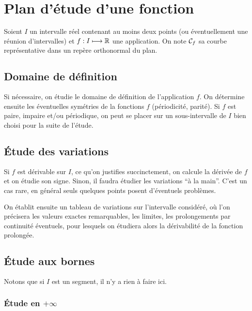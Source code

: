 \chapter{Plan d'étude d'une fonction}

Soient \(I\) un intervalle réel contenant au moins deux points (ou éventuellement une réunion d'intervalles) et \(f : I \longmapsto \mathbb{R}\) une application. On note \(\mathcal{C}_f\) sa courbe représentative dans un repère orthonormal du plan.

\section{Domaine de définition}

Si nécessaire, on étudie le domaine de définition de l'application \(f\). On détermine ensuite les éventuelles symétries de la fonctions \(f\) (périodicité, parité). Si \(f\) est paire, impaire et/ou périodique, on peut se placer sur un sous-intervalle de \(I\) bien choisi pour la suite de l'étude.

\section{Étude des variations}

Si \(f\) est dérivable sur \(I\), ce qu'on justifies succinctement, on calcule la dérivée de \(f\) et on étudie son signe. Sinon, il faudra étudier les variations ``à la main''. C'est un cas rare, en général seuls quelques points posent d'éventuels problèmes.

On établit ensuite un tableau de variations sur l'intervalle considéré, où l'on précisera les valeurs exactes remarquables, les limites, les prolongements par continuité éventuels, pour lesquels on étudiera alors la dérivabilité de la fonction prolongée.

\section{Étude aux bornes}

Notons que si \(I\) est un segment, il n'y a rien à faire ici.

\subsection{Étude en \(+\infty\)}

